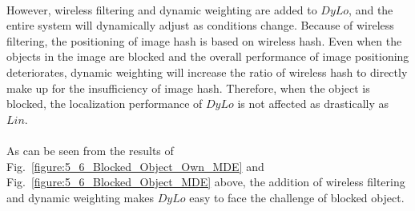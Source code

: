 \documentclass[a4paper,12pt]{report}
\begin{document}
\paragraph{}
However, wireless filtering and dynamic weighting are added to $DyLo$, and the entire system will dynamically adjust as conditions change. Because of wireless filtering, the positioning of image hash is based on wireless hash. Even when the objects in the image are blocked and the overall performance of image positioning deteriorates, dynamic weighting will increase the ratio of wireless hash to directly make up for the insufficiency of image hash. Therefore, when the object is blocked, the localization performance of $DyLo$ is not affected as drastically as $Lin$.

\paragraph{}
As can be seen from the results of Fig.~\ref{figure:5_6_Blocked_Object_Own_MDE} and Fig.~\ref{figure:5_6_Blocked_Object_MDE} above, the addition of wireless filtering and dynamic weighting makes $DyLo$ easy to face the challenge of blocked object.
\end{document}
